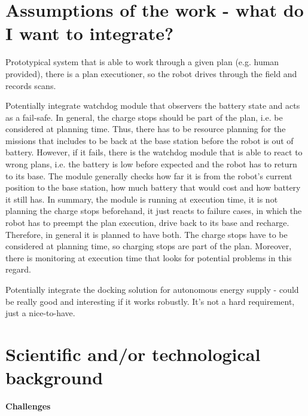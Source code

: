 \documentclass[german, master, expose, latin1]{base/thesis_KBS}
\begin{document}
\section{Assumptions of the work - what do I want to integrate?}

Prototypical system that is able to work through a given plan (e.g. human provided), there is a plan executioner, so the robot drives through the field and records scans.\newline

Potentially integrate watchdog module that observers the battery state and acts as a fail-safe. In general, the charge stops should be part of the plan,
i.e. be considered at planning time. Thus, there has to be resource planning for the missions that includes to be back at the base station before the robot is out of battery.
However, if it fails, there is the watchdog module that is able to react to wrong plans, i.e. the battery is low before expected and the robot has to return to its base.
The module generally checks how far it is from the robot's current position to the base station, how much battery that would cost and how battery it still has.
In summary, the module is running at execution time, it is not planning the charge stops beforehand, it just reacts to failure cases, in which the robot has to preempt
the plan execution, drive back to its base and recharge. Therefore, in general it is planned to have both. The charge stops have to be considered at planning time,
so charging stops are part of the plan. Moreover, there is monitoring at execution time that looks for potential problems in this regard.\newline

Potentially integrate the docking solution for autonomous energy supply - could be really good and interesting if it works robustly.
It's not a hard requirement, just a nice-to-have.\newline

\section{Scientific and/or technological background}

\textbf{Challenges}\newline
\end{document}
